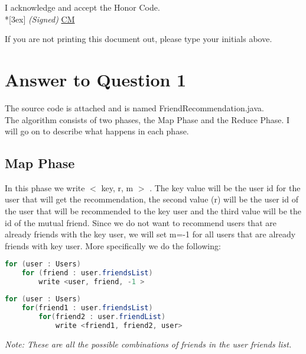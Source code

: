 \documentclass[11pt]{article}
\begin{document}
\vfill

I acknowledge and accept the Honor Code.\\*[3ex]
\bigskip
\textit{(Signed)} \underline{CM} 

If you are not printing this document out, please type your initials above.

\vfill
\vfill

\pagebreak[4]
\section*{Answer to Question 1}
The source code is attached and is named FriendRecommendation.java. \\
The algorithm consists of two phases, the Map Phase and the Reduce Phase. I will go on to describe what happens in each phase.

\subsection*{Map Phase}
In this phase we write $<$ key, r, m $>$ . The key value will be the user id for the user that will get the recommendation, the second value (r) will be the user id of the user that will be recommended to the key user and the third value will be the id of the mutual friend. Since we do not want to recommend users that are already friends with the key user, we will set m=-1 for all users that are already friends with key user. 
More specifically we do the following:
\begin{lstlisting}[language=Java]
for (user : Users)
	for (friend : user.friendsList)
		write <user, friend, -1 >
\end{lstlisting}
\begin{lstlisting}[language=Java]
for (user : Users)
	for(friend1 : user.friendsList)
		for(friend2 : user.friendList)
			write <friend1, friend2, user>
\end{lstlisting}
\textit{Note: These are all the possible combinations of friends in the user friends list.}
\end{document}
